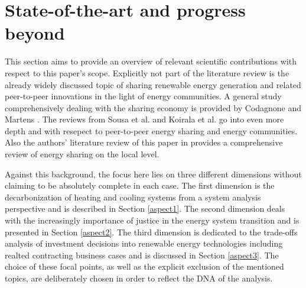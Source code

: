 \newpage
\section{State-of-the-art and progress beyond}\label{stateoftheart}
This section aims to provide an overview of relevant scientific contributions with respect to this paper's scope. Explicitly not part of the literature review is the already widely discussed topic of sharing renewable energy generation and related peer-to-peer innovations in the light of energy communities. A general study comprehensively dealing with the sharing economy is provided by Codagnone and Martens \cite{codagnone2016scoping}. The reviews from Sousa et al. \cite{sousa2019peer} and Koirala et al. \cite{koirala2016energetic} go into even more depth and with resepect to peer-to-peer energy sharing and energy communities. Also the authors' literature review of this paper in \cite{zwickl2021open} provides a comprehensive review of energy sharing on the local level.\vspace{0.5cm}

Against this background, the focus here lies on three different dimensions without claiming to be absolutely complete in each case. The first dimension is the decarbonization of heating and cooling systems from a system analysis perspective and is described in Section \ref{aspect1}. The second dimension deals with the increasingly importance of justice in the energy system transition and is presented in Section \ref{aspect2}. The third dimension is dedicated to the trade-offs analysis of investment decisions into renewable energy technologies including realted contracting business cases and is discussed in Section \ref{aspect3}. The choice of these focal points, as well as the explicit exclusion of the mentioned topics, are deliberately chosen in order to reflect the DNA of the analysis. 

